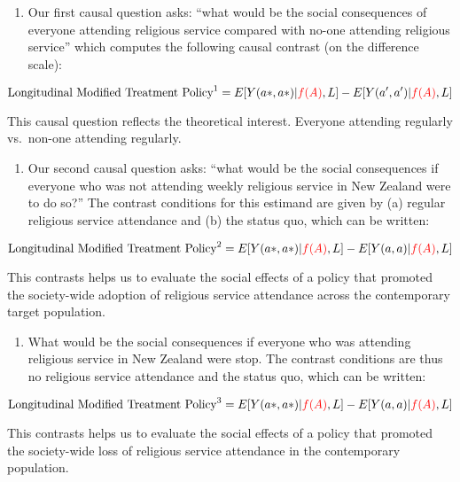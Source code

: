 \documentclass[
  singlecolumn]{article}
\providecommand{\tightlist}{%
  \setlength{\itemsep}{0pt}\setlength{\parskip}{0pt}}\usepackage{longtable,booktabs,array}
\begin{document}
\begin{enumerate}
\def\labelenumi{\arabic{enumi}.}
\tightlist
\item
  Our first causal question asks: ``what would be the social
  consequences of everyone attending religious service compared with
  no-one attending religious service'' which computes the following
  causal contrast (on the difference scale):
\end{enumerate}

\[ \text{Longitudinal Modified Treatment Policy}^1 = E[Y(a*,a*)|\textcolor{red}{f(A)},L] - E[Y(a^\prime,a^\prime)|\textcolor{red}{f(A)},L] \]

This causal question reflects the theoretical interest. Everyone
attending regularly vs.~non-one attending regularly.

\begin{enumerate}
\def\labelenumi{\arabic{enumi}.}
\setcounter{enumi}{1}
\tightlist
\item
  Our second causal question asks: ``what would be the social
  consequences if everyone who was not attending weekly religious
  service in New Zealand were to do so?'' The contrast conditions for
  this estimand are given by (a) regular religious service attendance
  and (b) the status quo, which can be written:
\end{enumerate}

\[ \text{Longitudinal Modified Treatment Policy}^2 = E[Y(a*,a*)|\textcolor{red}{f(A)},L] - E[Y(a,a)|\textcolor{red}{f(A)},L] \]

This contrasts helps us to evaluate the social effects of a policy that
promoted the society-wide adoption of religious service attendance
across the contemporary target population.

\begin{enumerate}
\def\labelenumi{\arabic{enumi}.}
\setcounter{enumi}{2}
\tightlist
\item
  What would be the social consequences if everyone who was attending
  religious service in New Zealand were stop. The contrast conditions
  are thus no religious service attendance and the status quo, which can
  be written:
\end{enumerate}

\[ \text{Longitudinal Modified Treatment Policy}^3 = E[Y(a*,a*)|\textcolor{red}{f(A)},L] - E[Y(a,a)|\textcolor{red}{f(A)},L] \]

This contrasts helps us to evaluate the social effects of a policy that
promoted the society-wide loss of religious service attendance in the
contemporary population.
\end{document}
